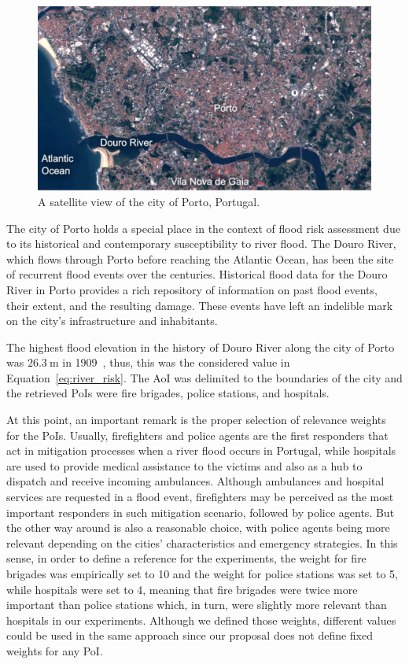 \begin{refsection}
\begin{figure}[h]
    \centering
    \includegraphics[width=0.9\linewidth]{Chapters/6-Flood/figs/porto_satellite.pdf}
    \caption{A satellite view of the city of Porto, Portugal.}
    \label{fig:porto_douro}
\end{figure}

The city of Porto holds a special place in the context of flood risk assessment due to its historical and contemporary susceptibility to river flood. The Douro River, which flows through Porto before reaching the Atlantic Ocean, has been the site of recurrent flood events over the centuries. Historical flood data for the Douro River in Porto provides a rich repository of information on past flood events, their extent, and the resulting damage. These events have left an indelible mark on the city's infrastructure and inhabitants.

The highest flood elevation in the history of Douro River along the city of Porto was $26.3~\mathrm{m}$ in 1909~\cite{inundacaodouro}, thus, this was the considered value in Equation~\ref{eq:river_risk}. The AoI was delimited to the boundaries of the city and the retrieved PoIs were fire brigades, police stations, and hospitals. 

At this point, an important remark is the proper selection of relevance weights for the PoIs. Usually, firefighters and police agents are the first responders that act in mitigation processes when a river flood occurs in Portugal, while hospitals are used to provide medical assistance to the victims and also as a hub to dispatch and receive incoming ambulances. Although ambulances and hospital services are requested in a flood event, firefighters may be perceived as the most important responders in such mitigation scenario, followed by police agents. But the other way around is also a reasonable choice, with police agents being more relevant depending on the cities' characteristics and emergency strategies. In this sense, in order to define a reference for the experiments, the weight for fire brigades was empirically set to 10 and the weight for police stations was set to 5, while hospitals were set to 4, meaning that fire brigades were twice more important than police stations which, in turn, were slightly more relevant than hospitals in our experiments. Although we defined those weights, different values could be used in the same approach since our proposal does not define fixed weights for any PoI. 


\end{refsection}

